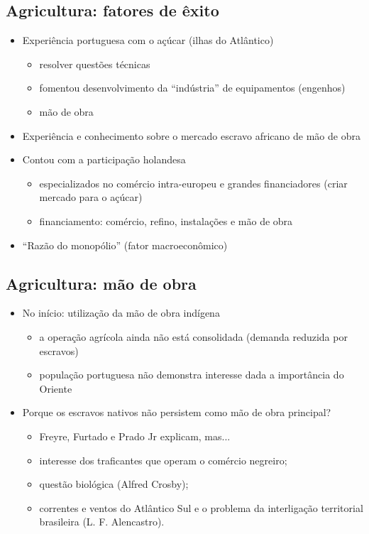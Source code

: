 \documentclass[a4paper,12pt]{article}[abntex2]
\begin{document}
\subsection{\textbf{Agricultura: fatores de êxito}}
\begin{itemize}
    \item Experiência portuguesa com o açúcar (ilhas do Atlântico) \begin{itemize}
        \item resolver questões técnicas
        \item fomentou desenvolvimento da “indústria” de equipamentos (engenhos)
        \item mão de obra
    \end{itemize}
    \item Experiência e conhecimento sobre o mercado escravo africano de mão de obra
    \item Contou com a participação holandesa \begin{itemize}
        \item especializados no comércio intra-europeu e grandes financiadores (criar mercado para o açúcar)
        \item financiamento: comércio, refino, instalações e mão de obra
    \end{itemize}
    \item “Razão do monopólio” (fator macroeconômico)
\end{itemize}

\subsection{\textbf{Agricultura: mão de obra}}
\begin{itemize}
    \item No início: utilização da mão de obra indígena \begin{itemize}
        \item a operação agrícola ainda não está consolidada (demanda reduzida por escravos)
        \item população portuguesa não demonstra interesse dada a importância do Oriente
    \end{itemize}
    \item Porque os escravos nativos não persistem como mão de obra principal? \begin{itemize}
        \item Freyre, Furtado e Prado Jr explicam, mas...
        \item interesse dos traficantes que operam o comércio negreiro;
        \item questão biológica (Alfred Crosby);
        \item correntes e ventos do Atlântico Sul e o problema da interligação territorial brasileira (L. F. Alencastro).
    \end{itemize}
\end{itemize}
\end{document}
